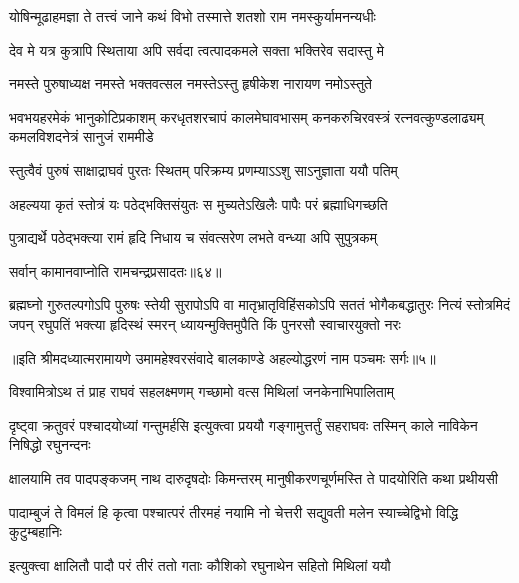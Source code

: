 \twolineshloka
{योषिन्मूढाहमज्ञा ते तत्त्वं जाने कथं विभो}
{तस्मात्ते शतशो राम नमस्कुर्यामनन्यधीः} %

\twolineshloka
{देव मे यत्र कुत्रापि स्थिताया अपि सर्वदा}
{त्वत्पादकमले सक्ता भक्तिरेव सदास्तु मे} %

\twolineshloka
{नमस्ते पुरुषाध्यक्ष नमस्ते भक्तवत्सल}
{नमस्तेऽस्तु हृषीकेश नारायण नमोऽस्तुते} %

\fourlineindentedshloka
{भवभयहरमेकं भानुकोटिप्रकाशम्}
{करधृतशरचापं कालमेघावभासम्}
{कनकरुचिरवस्त्रं रत्नवत्कुण्डलाढ्यम्}
{कमलविशदनेत्रं सानुजं राममीडे} %

\twolineshloka
{स्तुत्वैवं पुरुषं साक्षाद्राघवं पुरतः स्थितम्}
{परिक्रम्य प्रणम्याऽऽशु साऽनुज्ञाता ययौ पतिम्} %

\twolineshloka
{अहल्यया कृतं स्तोत्रं यः पठेद्भक्तिसंयुतः}
{स मुच्यतेऽखिलैः पापैः परं ब्रह्माधिगच्छति} %

\twolineshloka
{पुत्राद्यर्थे पठेद्भक्त्या रामं हृदि निधाय च}
{संवत्सरेण लभते वन्ध्या अपि सुपुत्रकम्} %

{सर्वान् कामानवाप्नोति रामचन्द्रप्रसादतः॥६४॥} %


\fourlineindentedshloka
{ब्रह्मघ्नो गुरुतल्पगोऽपि पुरुषः स्तेयी सुरापोऽपि वा}
{मातृभ्रातृविहिंसकोऽपि सततं भोगैकबद्धातुरः}
{नित्यं स्तोत्रमिदं जपन् रघुपतिं भक्त्या हृदिस्थं स्मरन्}
{ध्यायन्मुक्तिमुपैति किं पुनरसौ स्वाचारयुक्तो नरः} %

{॥इति श्रीमदध्यात्मरामायणे उमामहेश्वरसंवादे बालकाण्डे
अहल्योद्धरणं नाम पञ्चमः सर्गः॥५॥
}




\twolineshloka
{विश्वामित्रोऽथ तं प्राह राघवं सहलक्ष्मणम्}
{गच्छामो वत्स मिथिलां जनकेनाभिपालिताम्} %

\threelineshloka
{दृष्ट्वा क्रतुवरं पश्चादयोध्यां गन्तुमर्हसि}
{इत्युक्त्वा प्रययौ गङ्गामुत्तर्तुं सहराघवः}
{तस्मिन् काले नाविकेन निषिद्धो रघुनन्दनः} %


\fourlineindentedshloka
{क्षालयामि तव पादपङ्कजम्}
{नाथ दारुदृषदोः किमन्तरम्}
{मानुषीकरणचूर्णमस्ति ते}
{पादयोरिति कथा प्रथीयसी} %

\fourlineindentedshloka
{पादाम्बुजं ते विमलं हि कृत्वा}
{पश्चात्परं तीरमहं नयामि}
{नो चेत्तरी सद्युवती मलेन}
{स्याच्चेद्विभो विद्धि कुटुम्बहानिः} %

\twolineshloka
{इत्युक्त्वा क्षालितौ पादौ परं तीरं ततो गताः}
{कौशिको रघुनाथेन सहितो मिथिलां ययौ} %

